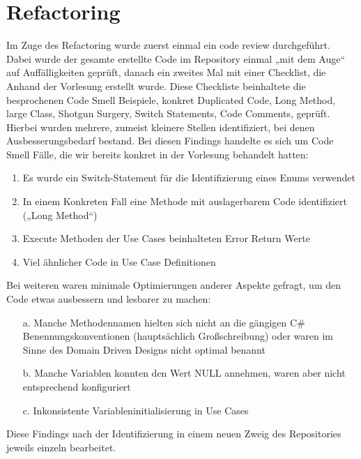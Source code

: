 \chapter{Refactoring}

Im Zuge des Refactoring wurde zuerst einmal ein code review durchgeführt. Dabei wurde der gesamte erstellte Code im Repository einmal „mit dem Auge“ auf Auffälligkeiten geprüft, danach ein zweites Mal mit einer Checklist, die Anhand der Vorlesung erstellt wurde. Diese Checkliste beinhaltete die besprochenen Code Smell Beispiele, konkret Duplicated Code, Long Method, large Class, Shotgun Surgery, Switch Statements, Code Comments, geprüft.
Hierbei wurden mehrere, zumeist kleinere Stellen identifiziert, bei denen Ausbesserungsbedarf bestand. Bei diesen Findings handelte es sich um Code Smell Fälle, die wir bereits konkret in der Vorlesung behandelt hatten:

\begin{enumerate}
\item Es wurde ein Switch-Statement für die Identifizierung eines Enums verwendet
\item In einem Konkreten Fall eine Methode mit auslagerbarem Code identifiziert („Long Method“)
\item Execute Methoden der Use Cases beinhalteten Error Return Werte
\item Viel ähnlicher Code in Use Case Definitionen
\end{enumerate}

Bei weiteren waren minimale Optimierungen anderer Aspekte gefragt, um den Code etwas ausbessern und lesbarer zu machen:
\begin{enumerate}
\item[a.] Manche Methodennamen hielten sich nicht an die gängigen C\# Benennungskonventionen (hauptsächlich Großschreibung) oder waren im Sinne des Domain Driven Designs nicht optimal benannt
\item[b.] Manche Variablen konnten den Wert NULL annehmen, waren aber nicht entsprechend konfiguriert
\item[c.] Inkonsistente Variableninitialisierung in Use Cases
\end{enumerate}

Diese Findings nach der Identifizierung in einem neuen Zweig des Repositories jeweils einzeln bearbeitet.

